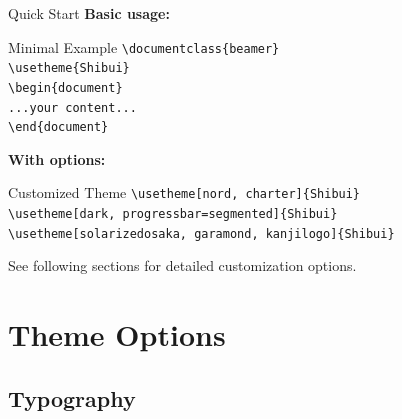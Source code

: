 \documentclass[aspectratio=169]{beamer}
\begin{document}
\begin{frame}{Quick Start}
  \textbf{Basic usage:}

  \vspace{0.5em}

  \begin{shibuiframe}{Minimal Example}
    \texttt{\textbackslash documentclass\{beamer\}} \\
    \texttt{\textbackslash usetheme\{Shibui\}} \\
    \texttt{\textbackslash begin\{document\}} \\
    \texttt{...your content...} \\
    \texttt{\textbackslash end\{document\}}
  \end{shibuiframe}

  \vspace{1em}

  \textbf{With options:}

  \vspace{0.5em}

  \begin{shibuiframe}{Customized Theme}
    \texttt{\textbackslash usetheme[nord, charter]\{Shibui\}} \\
    \texttt{\textbackslash usetheme[dark, progressbar=segmented]\{Shibui\}} \\
    \texttt{\textbackslash usetheme[solarizedosaka, garamond, kanjilogo]\{Shibui\}}
  \end{shibuiframe}

  \vspace{0.5em}

  \small See following sections for detailed customization options.
\end{frame}

\section{Theme Options}

\subsection{Typography}
\end{document}
